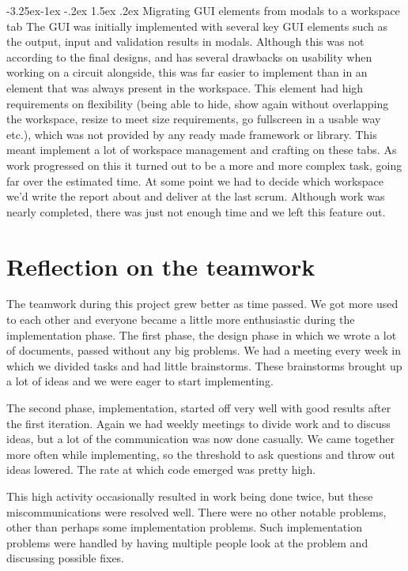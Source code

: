 \documentclass[a4paper]{article}
\makeatletter
\renewcommand\paragraph{\@startsection{paragraph}{4}{\z@}%
  {-3.25ex\@plus -1ex \@minus -.2ex}%
  {1.5ex \@plus .2ex}%
  {\normalfont\normalsize\bfseries}}
\makeatother
\begin{document}
\paragraph{Migrating GUI elements from modals to a workspace tab}
The GUI was initially implemented with several key GUI elements such as the output, input and validation results in modals. Although this was not according to the final designs, and has several drawbacks on usability when working on a circuit alongside, this was far easier to implement than in an element that was always present in the workspace. This element had high requirements on flexibility (being able to hide, show again without overlapping the workspace, resize to meet size requirements, go fullscreen in a usable way etc.), which was not provided by any ready made framework or library. This meant implement a lot of workspace management and crafting on these tabs. As work progressed on this it turned out to be a more and more complex task, going far over the estimated time. At some point we had to decide which workspace we'd write the report about and deliver at the last scrum. Although work was nearly completed, there was just not enough time and we left this feature out.



\pagebreak

\section{Reflection on the teamwork}
\label{team-reflection}
The teamwork during this project grew better as time passed. We got more used to each other and everyone became a little more enthusiastic during the implementation phase. The first phase, the design phase in which we wrote a lot of documents, passed without any big problems. We had a meeting every week in which we divided tasks and had little brainstorms. These brainstorms brought up a lot of ideas and we were eager to start implementing.

The second phase, implementation, started off very well with good results after the first iteration. Again we had weekly meetings to divide work and to discuss ideas, but a lot of the communication was now done casually. We came together more often while implementing, so the threshold to ask questions and throw out ideas lowered. The rate at which code emerged was pretty high.

This high activity occasionally resulted in work being done twice, but these miscommunications were resolved well. There were no other notable problems, other than perhaps some implementation problems. Such implementation problems were handled by having multiple people look at the problem and discussing possible fixes.
\end{document}
